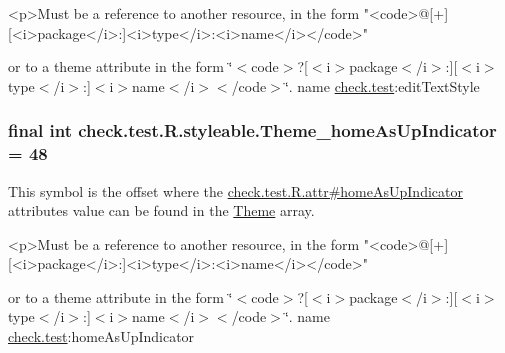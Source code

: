 \begin{DoxyVerb}      <p>Must be a reference to another resource, in the form "<code>@[+][<i>package</i>:]<i>type</i>:<i>name</i></code>"
\end{DoxyVerb}
 or to a theme attribute in the form \char`\"{}$<$code$>$?\mbox{[}$<$i$>$package$<$/i$>$\+:\mbox{]}\mbox{[}$<$i$>$type$<$/i$>$\+:\mbox{]}$<$i$>$name$<$/i$>$$<$/code$>$\char`\"{}.  name \hyperlink{namespacecheck_1_1test}{check.\+test}\+:edit\+Text\+Style \hypertarget{classcheck_1_1test_1_1_r_1_1styleable_aae9299f409cd1528cb1b807fe0eecbb0}{}
\subsubsection[{Theme\+\_\+home\+As\+Up\+Indicator}]{\setlength{\rightskip}{0pt plus 5cm}final int check.\+test.\+R.\+styleable.\+Theme\+\_\+home\+As\+Up\+Indicator = 48\hspace{0.3cm}{\ttfamily [static]}}\label{classcheck_1_1test_1_1_r_1_1styleable_aae9299f409cd1528cb1b807fe0eecbb0}
This symbol is the offset where the \hyperlink{classcheck_1_1test_1_1_r_1_1attr_a337a62ef9d44c64d88a4136aca1a5d52}{check.\+test.\+R.\+attr\#home\+As\+Up\+Indicator} attribute\textquotesingle{}s value can be found in the \hyperlink{classcheck_1_1test_1_1_r_1_1styleable_acca726d02016a0cf607782ec3a436a81}{Theme} array.

\begin{DoxyVerb}      <p>Must be a reference to another resource, in the form "<code>@[+][<i>package</i>:]<i>type</i>:<i>name</i></code>"
\end{DoxyVerb}
 or to a theme attribute in the form \char`\"{}$<$code$>$?\mbox{[}$<$i$>$package$<$/i$>$\+:\mbox{]}\mbox{[}$<$i$>$type$<$/i$>$\+:\mbox{]}$<$i$>$name$<$/i$>$$<$/code$>$\char`\"{}.  name \hyperlink{namespacecheck_1_1test}{check.\+test}\+:home\+As\+Up\+Indicator \hypertarget{classcheck_1_1test_1_1_r_1_1styleable_a26daf114808db4e2394c40f88131eb51}{}
